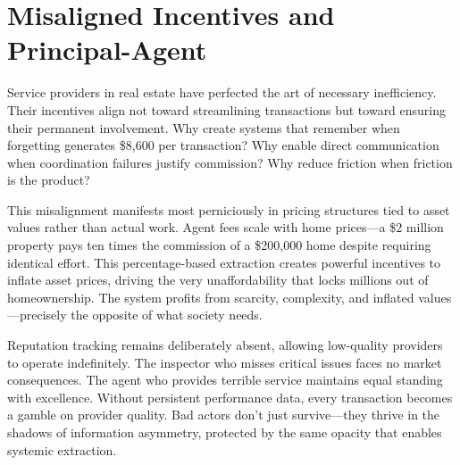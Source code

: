 \section{Misaligned Incentives and Principal-Agent}

Service providers in real estate have perfected the art of necessary inefficiency. Their incentives align not toward streamlining transactions but toward ensuring their permanent involvement. Why create systems that remember when forgetting generates \$8,600 per transaction? Why enable direct communication when coordination failures justify commission? Why reduce friction when friction is the product?

This misalignment manifests most perniciously in pricing structures tied to asset values rather than actual work. Agent fees scale with home prices—a \$2 million property pays ten times the commission of a \$200,000 home despite requiring identical effort. This percentage-based extraction creates powerful incentives to inflate asset prices, driving the very unaffordability that locks millions out of homeownership. The system profits from scarcity, complexity, and inflated values—precisely the opposite of what society needs.

Reputation tracking remains deliberately absent, allowing low-quality providers to operate indefinitely. The inspector who misses critical issues faces no market consequences. The agent who provides terrible service maintains equal standing with excellence. Without persistent performance data, every transaction becomes a gamble on provider quality. Bad actors don't just survive—they thrive in the shadows of information asymmetry, protected by the same opacity that enables systemic extraction.

